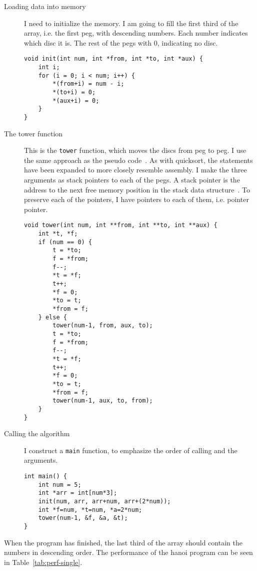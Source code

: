 \begin{description}
    \item[Loading data into memory] I need to initialize the memory. I am
        going to fill the first third of the array, i.e. the first peg, with
        descending numbers. Each number indicates which disc it is. The rest of
        the pegs with 0, indicating no disc.
\begin{lstlisting}
void init(int num, int *from, int *to, int *aux) {
    int i;
    for (i = 0; i < num; i++) {
        *(from+i) = num - i;
        *(to+i) = 0;
        *(aux+i) = 0;
    }
}
\end{lstlisting}

    \item[The tower function] This is the \texttt{tower} function, which
        moves the discs from peg to peg. I use the same approach as the pseudo
        code~\cite{ref:hanoi}. As with quicksort, the statements have been
        expanded to more closely resemble assembly. I make the three arguments
        as stack pointers to each of the pegs. A stack pointer is the address
        to the next free memory position in the stack data
        structure~\cite{ref:ark-book}. To preserve each of the pointers, I have
        pointers to each of them, i.e. pointer pointer.
\newpage
        \begin{lstlisting}
void tower(int num, int **from, int **to, int **aux) {
    int *t, *f;
    if (num == 0) {
        t = *to;
        f = *from;
        f--;
        *t = *f;
        t++;
        *f = 0;
        *to = t;
        *from = f;
    } else {
        tower(num-1, from, aux, to);
        t = *to;
        f = *from;
        f--;
        *t = *f;
        t++;
        *f = 0;
        *to = t;
        *from = f;
        tower(num-1, aux, to, from);
    }
}
\end{lstlisting}

    \item[Calling the algorithm] I construct a \texttt{main} function, to
        emphasize the order of calling and the arguments.
\begin{lstlisting}
int main() {
    int num = 5;
    int *arr = int[num*3];
    init(num, arr, arr+num, arr+(2*num));
    int *f=num, *t=num, *a=2*num;
    tower(num-1, &f, &a, &t);
}
\end{lstlisting}
\end{description}
When the program has finished, the last third of the array should contain the
numbers in descending order. The performance of the hanoi program can be seen
in Table~\ref{tab:perf-single}.
